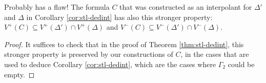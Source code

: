 \begin{thm}\label{thm:stl-lyndon}
  {\color{red} Probably has a flaw!}
  The formula $C$ that was constructed as an interpolant for $\Delta'$ and $\Delta$ in Corollary \ref{cor:stl-dedint} has also this stronger property: $V^+(C) \subseteq V^+(\Delta') \cap V^+(\Delta)$ and $V^-(C) \subseteq V^-(\Delta') \cap V^-(\Delta)$.
\end{thm}
\begin{proof}
  It suffices to check that in the proof of Theorem \ref{thm:stl-dedint}, this stronger property is preserved by our constructions of $C$, in the cases that are used to deduce Corollary \ref{cor:stl-dedint}, which are the cases where $\Gamma_2$ could be empty.
\end{proof}